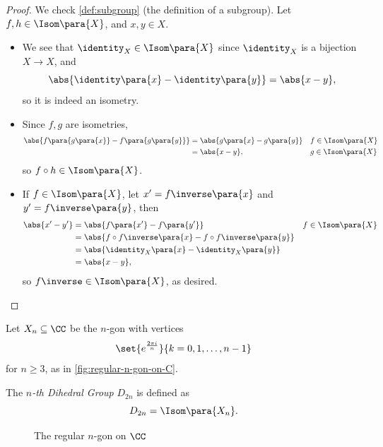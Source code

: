 \begin{proof}
    We check \autoref{def:subgroup} (the definition of a subgroup). Let \(f, h \in \Isom\para{X}\), and \(x, y \in X\).

    \begin{itemize}
        \item We see that \(\identity_{X} \in \Isom\para{X}\) since \(\identity_{X}\) is a bijection \(X \to X\), and
        \[
            \abs{\identity\para{x} - \identity\para{y}} = \abs{x - y},
        \]
        so it is indeed an isometry.

        \item Since \(f, g\) are isometries,
        \begin{align*}
            \abs{f\para{g \para{x}} - f\para{g \para{y}}} &= \abs{g\para{x} - g\para{y}} && f \in \Isom\para{X} \\
            &= \abs{x - y}, && g \in \Isom\para{X}
        \end{align*}
        so \(f \circ h \in \Isom\para{X}\).

        \item If \(f \in \Isom\para{X}\), let \(x' = f\inverse\para{x}\) and \(y' = f\inverse\para{y}\), then
        \begin{align*}
            \abs{x' - y'} &= \abs{f\para{x'} - f\para{y'}} && f \in \Isom\para{X} \\
            &= \abs{f \circ f\inverse \para{x} - f \circ f\inverse \para{y}} \\
            &= \abs{\identity_{X} \para{x} - \identity_{X} \para{y}} \\
            &= \abs{x - y},
        \end{align*}
        so \(f \inverse \in \Isom\para{X}\), as desired.
    \end{itemize}
\end{proof}

\begin{definition}
    Let \(X_n \subseteq \CC\) be the \(n\)-gon with vertices
    \[
        \set{e^{\frac{2 \pi i}{n}}}{k = 0, 1, \ldots, n - 1}
    \]
    for \(n \geq 3\), as in \autoref{fig:regular-n-gon-on-C}.

    The \emph{\(n\)-th Dihedral Group} \(D_{2n}\) is defined as
    \[
        D_{2n} = \Isom\para{X_n}.
    \]
\end{definition}

\begin{figure}[ht!]
    \centering
    \caption{The regular \(n\)-gon on \(\CC\)}
    \label{fig:regular-n-gon-on-C}
\end{figure}

